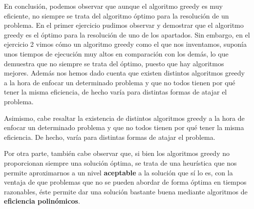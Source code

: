 En conclusión, podemos observar que aunque el algoritmo greedy es muy eficiente, 
no siempre se trata del algoritmo óptimo para la resolución de un problema. 
En el primer ejercicio pudimos observar y demostrar que el algoritmo greedy es 
el óptimo para la resolución de uno de los apartados. Sin embargo, en el ejercicio 2
vimos cómo un algoritmo greedy como el que nos inventamos, 
suponía unos tiempos de ejecución muy altos en comparación con los demás, lo que demuestra que no siempre
se trata del óptimo, puesto que hay algoritmos mejores.
Además nos hemos dado cuenta que existen distintos algoritmos greedy a la hora de enfocar un determinado problema y que no todos tienen por qué tener la misma eficiencia,
de hecho varía para distintas formas de atajar el problema. 

Asimismo, cabe resaltar la existencia de distintos algoritmos greedy a la hora de 
enfocar un determinado problema y que no todos tienen por qué tener la misma eficiencia. 
De hecho, varía para distintas formas de atajar el problema. 

Por otra parte, también cabe observar que, si bien los algoritmos greedy no
proporcionan siempre una solución óptima, se trata de una heurística que nos
permite aproximarnos a un nivel \textbf{aceptable} a la solución que sí lo es, con la 
ventaja de que problemas que no se pueden abordar de forma óptima en tiempos
razonables, éste permite dar una solución bastante buena mediante algoritmos 
de \textbf{eficiencia polinómicos}. 
